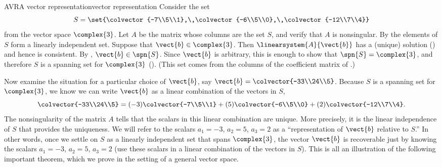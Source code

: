 \begin{example}{AVR}{A vector representation}{vector representation}
Consider the set 
%
\begin{equation*}
S=\set{\colvector{-7\\5\\1},\,\colvector{-6\\5\\0},\,\colvector{-12\\7\\4}}
\end{equation*}
%
from the vector space $\complex{3}$.  Let $A$ be the matrix whose columns are the set $S$, and verify that $A$ is nonsingular.  By  the elements of $S$ form a linearly independent set.  Suppose that $\vect{b}\in\complex{3}$.  Then $\linearsystem{A}{\vect{b}}$ has a (unique) solution () and hence is consistent.  By , $\vect{b}\in\spn{S}$.  Since $\vect{b}$ is arbitrary, this is enough to show that $\spn{S}=\complex{3}$, and therefore $S$ is a spanning set for $\complex{3}$ ().  (This set comes from the columns of the coefficient matrix of .)\par
%
Now examine the situation for a particular choice of $\vect{b}$, say $\vect{b}=\colvector{-33\\24\\5}$.  Because $S$ is a spanning set for $\complex{3}$, we know we can write $\vect{b}$ as a linear combination of the vectors in $S$,
%
\begin{equation*}
\colvector{-33\\24\\5}=
(-3)\colvector{-7\\5\\1}+(5)\colvector{-6\\5\\0}+(2)\colvector{-12\\7\\4}.
\end{equation*}
%
The nonsingularity of the matrix $A$ tells that the scalars in this linear combination are unique.  More precisely, it is the linear independence of $S$ that provides the uniqueness.  We will refer to the scalars $a_1=-3$, $a_2=5$, $a_3=2$ as a ``representation of $\vect{b}$ relative to $S$.''  In other words, once we settle on $S$ as a linearly independent set that spans $\complex{3}$, the vector $\vect{b}$ is recoverable just by knowing the scalars $a_1=-3$, $a_2=5$, $a_3=2$ (use these scalars in a linear combination of the vectors in $S$).   This is all an illustration of the following important theorem, which we prove in the setting of a general vector space.
\end{example}
